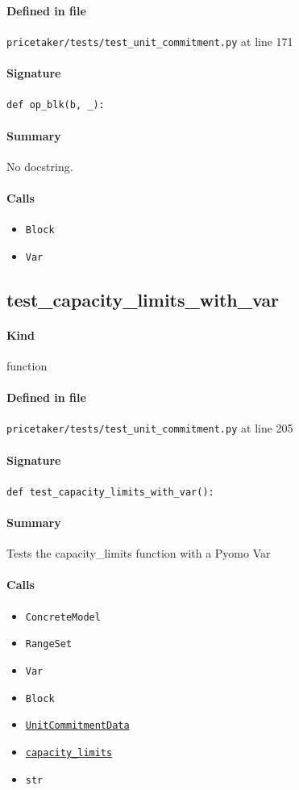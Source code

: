 \documentclass[11pt]{report}
\begin{document}
\paragraph{Defined in file} \texttt{pricetaker/tests/test\_unit\_commitment.py} at line 171
\paragraph{Signature} \texttt{def op\_blk(b, \_):}
\paragraph{Summary} No docstring.
\paragraph{Calls}
\begin{itemize}[leftmargin=*]
  \item \texttt{Block}
  \item \texttt{Var}
\end{itemize}
\subsection{test\_capacity\_limits\_with\_var}
\label{def:pricetaker-tests-test_unit_commitment.py:test_capacity_limits_with_var:L205}
\paragraph{Kind} function
\paragraph{Defined in file} \texttt{pricetaker/tests/test\_unit\_commitment.py} at line 205
\paragraph{Signature} \texttt{def test\_capacity\_limits\_with\_var():}
\paragraph{Summary} Tests the capacity\_limits function with a Pyomo Var
\paragraph{Calls}
\begin{itemize}[leftmargin=*]
  \item \texttt{ConcreteModel}
  \item \texttt{RangeSet}
  \item \texttt{Var}
  \item \texttt{Block}
  \item \hyperref[def:pricetaker-unit_commitment.py:UnitCommitmentData:L26]{\texttt{UnitCommitmentData}}
  \item \hyperref[def:pricetaker-unit_commitment.py:capacity_limits:L180]{\texttt{capacity\_limits}}
  \item \texttt{str}
\end{itemize}
\end{document}
